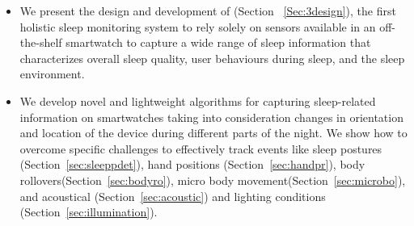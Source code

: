 \begin{itemize}[noitemsep]
	\item We present the design and development of \systemname (Section ~\ref{Sec:3design}), the first holistic sleep monitoring system to rely solely on sensors
available in an off-the-shelf smartwatch to capture a wide range of sleep information that characterizes overall sleep quality, user
behaviours during sleep, and the sleep environment.
	
\item We develop novel and lightweight algorithms for capturing sleep-related information on smartwatches taking into consideration
    changes in orientation and location of the device during different parts of the night. We show how to overcome specific challenges to
    effectively track events like sleep postures (Section~\ref{sec:sleeppdet}), hand positions (Section~\ref{sec:handpr}), body
    rollovers(Section~\ref{sec:bodyro}), micro body movement(Section~\ref{sec:microbo}), and acoustical (Section~\ref{sec:acoustic}) and
    lighting conditions (Section~\ref{sec:illumination}).



\end{itemize}
